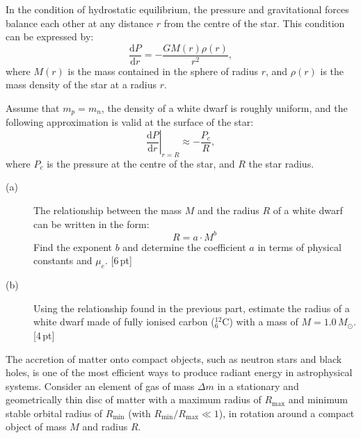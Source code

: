 In the condition of hydrostatic equilibrium, the pressure and gravitational
forces balance each other at any distance $r$ from the centre of the star.
This condition can be expressed by:
\[ \frac{\mathrm{d}P}{\mathrm{d}r} = -\frac{GM(r)\rho(r)}{r^2}, \]
where $M(r)$ is the mass contained in the sphere of radius $r$, and $\rho(r)$
is the mass density of the star at a radius $r$.

Assume that $m_p = m_n$, the density of a white dwarf is roughly uniform, and
the following approximation is valid at the surface of the star:
\[ \left.\frac{\mathrm{d}P}{\mathrm{d}r}\right|_{r=R}
   \approx -\frac{P_c}{R}, \]
where $P_c$ is the pressure at the centre of the star, and $R$ the star
radius.

\begin{description}
\item[(a)] The relationship between the mass $M$ and the radius $R$ of a white
  dwarf can be written in the form:
  \[ R = a \cdot M^b \]
  Find the exponent $b$ and determine the coefficient $a$ in terms of physical
  constants and $\mu_e$. \hfill[6\,pt]
\item[(b)] Using the relationship found in the previous part, estimate the
  radius of a white dwarf made of fully ionised carbon
  ($^{12}_{6}\mathrm{C}$) with a mass of $M = 1.0\,M_\odot$. \hfill[4\,pt]
\end{description}

The accretion of matter onto compact objects, such as neutron stars and black
holes, is one of the most efficient ways to produce radiant energy in
astrophysical systems. Consider an element of gas of mass $\Delta m$ in a
stationary and geometrically thin disc of matter with a maximum radius of
$R_{\mathrm{max}}$ and minimum stable orbital radius of $R_{\mathrm{min}}$
(with $R_{\mathrm{min}}/R_{\mathrm{max}} \ll 1$), in rotation around a compact
object of mass $M$ and radius $R$.


